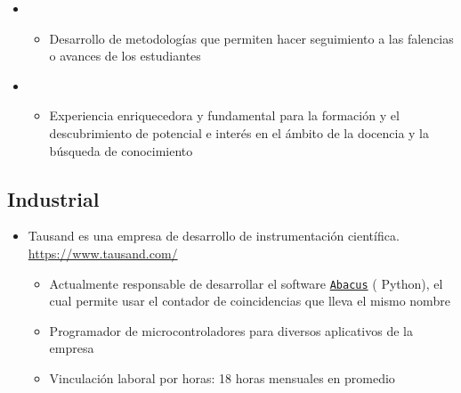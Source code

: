 \documentclass[11pt, letterpaper, sans]{moderncv}        %
\begin{document}
\begin{itemize}
{{\begin{itemize}
					\end{itemize} 
				}
			}
			\vspace{6pt}
			\item
			{
				{
					\vspace{3pt}
					\begin{itemize}
						\item Desarrollo de metodologías que permiten hacer seguimiento a las falencias o avances de los estudiantes
					\end{itemize}
				}
			}
			\vspace{6pt}
			
			\item{
				{
					\vspace{3pt}
					\begin{itemize}
						\item Experiencia enriquecedora y fundamental para la formaci\'on y el descubrimiento de potencial e inter\'es en el \'ambito de la docencia y la b\'usqueda de conocimiento
					\end{itemize}
				}
			}
		\end{itemize}
	\vspace{6pt}
	\subsection{Industrial}
		\begin{itemize}
			\item
			{
				{
					Tausand es una empresa de desarrollo de instrumentación científica. \url{https://www.tausand.com/}
					\vspace{3pt}
					\begin{itemize}
						\item Actualmente responsable de desarrollar el software \href{https://www.tausand.com/downloads/}{\texttt{Abacus}} ({\color{blue} Python}), el cual permite usar el contador de coincidencias que lleva el mismo nombre
						\item Programador de microcontroladores para diversos aplicativos de la empresa
						\item Vinculaci\'on laboral por horas: 18 horas mensuales en promedio
					\end{itemize}
				}
			}
			\vspace{6pt}
		\end{itemize}
\end{document}
